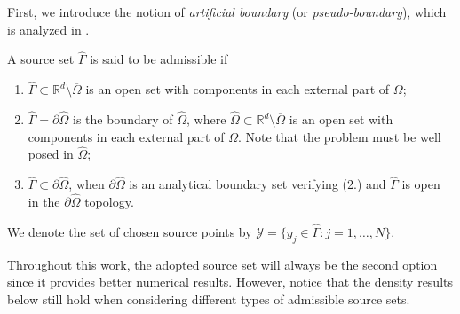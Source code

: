 First, we introduce the notion of \textit{artificial boundary} (or \textit{pseudo-boundary}), which is analyzed in \cite{alves2009choice}.
\begin{definition}
    A source set \(\hat{\Gamma}\) is said to be admissible if
    \begin{enumerate}
        \item \(\hat{\Gamma} \subset \mathbb{R}^d\setminus \overline{\Omega}\) is an open set with components in each external part of \(\Omega\);
        \item \(\hat{\Gamma} = \partial \hat{\Omega}\) is the boundary of \(\hat{\Omega}\), where \(\hat{\Omega} \subset \mathbb{R}^d\setminus\overline{\Omega}\) is an open set with components in each external part of \(\Omega\). Note that the problem must be well posed in \(\hat{\Omega}\);
        \item \(\hat{\Gamma} \subset \partial \hat{\Omega}\), when \(\partial \hat{\Omega}\) is an analytical boundary set verifying (2.) and \(\hat{\Gamma}\) is open in the \(\partial \hat{\Omega}\) topology. 
    \end{enumerate}
    We denote the set of chosen source points by \(\mathcal{Y} = \{y_j \in \hat{\Gamma}: j=1,\dots,N\}\).
\end{definition}
Throughout this work, the adopted source set will always be the second option since it provides better numerical results. However, notice that the density results below still hold when considering different types of admissible source sets.

